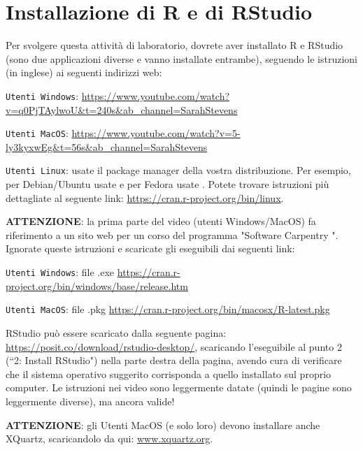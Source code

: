 \section{Installazione di R e di RStudio}

Per svolgere questa attività di laboratorio, dovrete aver installato R e RStudio (sono due applicazioni diverse e vanno installate entrambe), seguendo le istruzioni (in inglese) ai seguenti indirizzi web:

\begin{myitemize}
	\item \texttt{Utenti Windows}: \url{https://www.youtube.com/watch?v=q0PjTAylwoU&t=240s&ab_channel=SarahStevens}
	\item \texttt{Utenti MacOS}: \url{https://www.youtube.com/watch?v=5-ly3kyxwEg&t=56s&ab_channel=SarahStevens}
	\item \texttt{Utenti Linux}: usate il package manager della vostra distribuzione. Per esempio, per Debian/Ubuntu usate   e per Fedora usate . Potete trovare istruzioni più dettagliate al seguente link: \url{https://cran.r-project.org/bin/linux}.
\end{myitemize}
	
\noindent \textbf{ATTENZIONE}: la prima parte del video (utenti Windows/MacOS) fa riferimento a un sito web per un corso del programma "Software Carpentry ". Ignorate queste istruzioni e scaricate gli eseguibili dai seguenti link:

\begin{myitemize}
	\item \texttt{Utenti Windows}: file .exe \url{https://cran.r-project.org/bin/windows/base/release.htm}
    \item \texttt{Utenti MacOS}: file .pkg \url{https://cran.r-project.org/bin/macosx/R-latest.pkg}
\end{myitemize}	

\noindent RStudio pu\`o essere scaricato dalla seguente pagina: \url{https://posit.co/download/rstudio-desktop/}, scaricando l'eseguibile al punto 2 (``2: Install RStudio") nella parte destra della pagina, avendo cura di verificare che il sistema operativo suggerito corrisponda a quello installato sul proprio computer. Le istruzioni nei video sono leggermente datate (quindi le pagine sono leggermente diverse), ma ancora valide!


\vspace{0.3cm}

\noindent \textbf{ATTENZIONE}: gli Utenti MacOS (e solo loro) devono installare anche XQuartz, scaricandolo da qui: \url{www.xquartz.org}.

